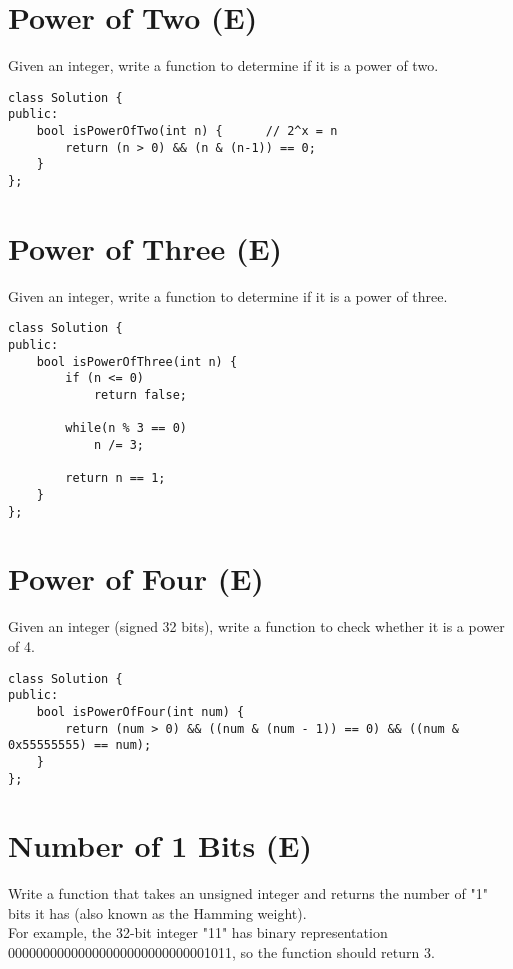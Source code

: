 \section{Power of Two (E)}
Given an integer, write a function to determine if it is a power of two. \\
 
\begin{lstlisting}
class Solution {
public:
    bool isPowerOfTwo(int n) {      // 2^x = n
        return (n > 0) && (n & (n-1)) == 0;
    }
};
\end{lstlisting}


\section{Power of Three (E)}
Given an integer, write a function to determine if it is a power of three. \\
 
\begin{lstlisting}
class Solution {
public:
    bool isPowerOfThree(int n) {
        if (n <= 0)
            return false;
            
        while(n % 3 == 0)
            n /= 3;
            
        return n == 1;
    }
};
\end{lstlisting}


\section{Power of Four (E)}
Given an integer (signed 32 bits), write a function to check whether it is a power of 4. \\

\begin{lstlisting}
class Solution {
public:
    bool isPowerOfFour(int num) {
        return (num > 0) && ((num & (num - 1)) == 0) && ((num & 0x55555555) == num);
    }
};
\end{lstlisting}


\section{Number of 1 Bits (E)}
Write a function that takes an unsigned integer and returns the number of "1" bits it has (also known as the Hamming weight).\\

For example, the 32-bit integer "11" has binary representation 00000000000000000000000000001011, so the function should return 3.\\

